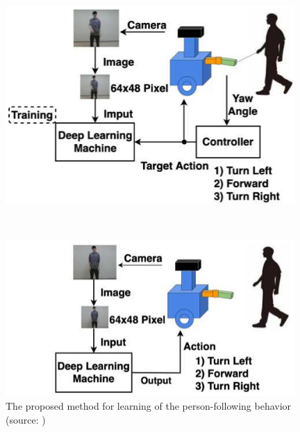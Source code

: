   \begin{figure}[h]
    \centering
    \begin{minipage}[c]{120mm} 
        \centering
        \includegraphics[width=110mm]{images/pdf/okada_learning_phase_system}
    \end{minipage} \\
    \vspace{1em} %
    \begin{minipage}[c]{120mm} 
        \centering
        \includegraphics[width=110mm]{images/pdf/okada_following_phase_system}
    \end{minipage}
    \caption[The proposed method for learning of the person-following behavior]{The proposed method for learning of the person-following behavior (source: \cite{okada})}
    \label{Fig:okada_system}
  \end{figure}

\newpage

